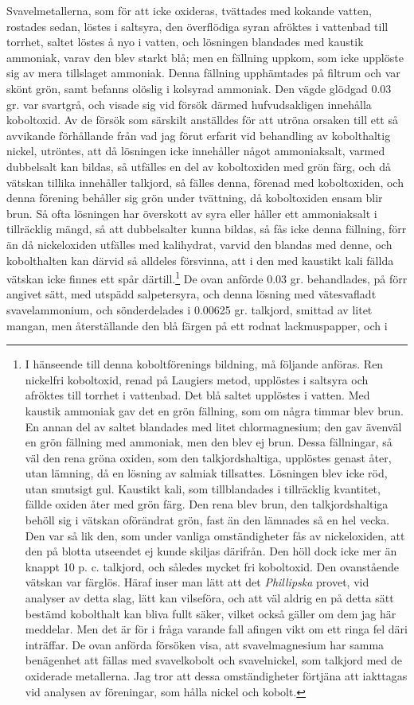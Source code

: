 \documentclass[a4paper, 12pt, oneside, swedish]{article}
\begin{document}
Svavelmetallerna, som för att icke oxideras, tvättades med kokande vatten, rostades sedan, löstes i saltsyra, den överflödiga syran afröktes i vattenbad till torrhet, saltet löstes å nyo i vatten, och lösningen blandades med kaustik ammoniak, varav den blev starkt blå; men en fällning uppkom, som icke upplöste sig av mera tillslaget ammoniak. Denna fällning upphämtades på filtrum och var skönt grön, samt befanns olöslig i kolsyrad ammoniak. Den vägde glödgad 0.03 gr. var svartgrå, och visade sig vid försök därmed hufvudsakligen innehålla koboltoxid. Av de försök som särskilt anställdes för att utröna orsaken till ett så avvikande förhållande från vad jag förut erfarit vid behandling av kobolthaltig nickel, utröntes, att då lösningen icke innehåller något ammoniaksalt, varmed dubbelsalt kan bildas, så utfälles en del av koboltoxiden med grön färg, och då vätskan tillika innehåller talkjord, så fälles denna, förenad med koboltoxiden, och denna förening behåller sig grön under tvättning, då koboltoxiden ensam blir brun. Så ofta lösningen har överskott av syra eller håller ett ammoniaksalt i tillräcklig mängd, så att dubbelsalter kunna bildas, så fås icke denna fällning, förr än då nickeloxiden utfälles med kalihydrat, varvid den blandas med denne, och kobolthalten kan därvid så alldeles försvinna, att i den med kaustikt kali fällda vätskan icke finnes ett spår därtill.\footnote{I hänseende till denna koboltförenings bildning, må följande anföras. Ren nickelfri koboltoxid, renad på Laugiers metod, upplöstes i saltsyra och afröktes till torrhet i vattenbad. Det blå saltet upplöstes i vatten. Med kaustik ammoniak gav det en grön fällning, som om några timmar blev brun. En annan del av saltet blandades med litet chlormagnesium; den gav ävenväl en grön fällning med ammoniak, men den blev ej brun. Dessa fällningar, så väl den rena gröna oxiden, som den talkjordshaltiga, upplöstes genast åter, utan lämning, då en lösning av salmiak tillsattes. Lösningen blev icke röd, utan smutsigt gul. Kaustikt kali, som tillblandades i tillräcklig kvantitet, fällde oxiden åter med grön färg. Den rena blev brun, den talkjordshaltiga behöll sig i vätskan oförändrat grön, fast än den lämnades så en hel vecka. Den var så lik den, som under vanliga omständigheter fås av nickeloxiden, att den på blotta utseendet ej kunde skiljas därifrån. Den höll dock icke mer än knappt 10 p. c. talkjord, och således mycket fri koboltoxid. Den ovanstående vätskan var färglös. Häraf inser man lätt att det \emph{Phillipska} provet, vid analyser av detta slag, lätt kan vilseföra, och att väl aldrig en på detta sätt bestämd kobolthalt kan bliva fullt säker, vilket också gäller om dem jag här meddelar. Men det är för i fråga varande fall afingen vikt om ett ringa fel däri inträffar. De ovan anförda försöken visa, att svavelmagnesium har samma benägenhet att fällas med svavelkobolt och svavelnickel, som talkjord med de oxiderade metallerna. Jag tror att dessa omständigheter förtjäna att iakttagas vid analysen av föreningar, som hålla nickel och kobolt.} De ovan anförde 0.03 gr. behandlades, på förr angivet sätt, med utspädd salpetersyra, och denna lösning med vätesvafladt svavelammonium, och sönderdelades i 0.00625 gr. talkjord, smittad av litet mangan, men återställande den blå färgen på ett rodnat lackmuspapper, och i 
\end{document}
